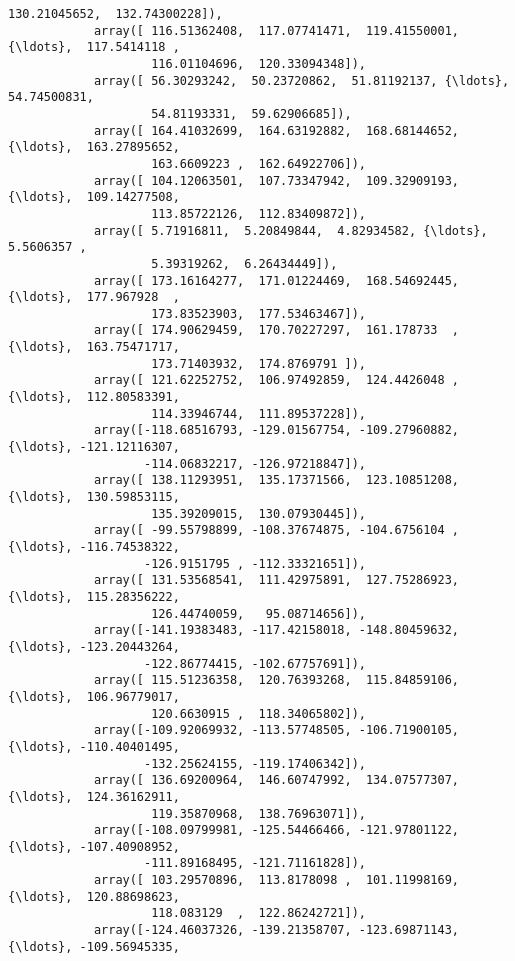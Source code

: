 \documentclass[11pt]{article}
\begin{document}
\begin{Verbatim}[commandchars=\\\{\}]
                    130.21045652,  132.74300228]),
            array([ 116.51362408,  117.07741471,  119.41550001, {\ldots},  117.5414118 ,
                    116.01104696,  120.33094348]),
            array([ 56.30293242,  50.23720862,  51.81192137, {\ldots},  54.74500831,
                    54.81193331,  59.62906685]),
            array([ 164.41032699,  164.63192882,  168.68144652, {\ldots},  163.27895652,
                    163.6609223 ,  162.64922706]),
            array([ 104.12063501,  107.73347942,  109.32909193, {\ldots},  109.14277508,
                    113.85722126,  112.83409872]),
            array([ 5.71916811,  5.20849844,  4.82934582, {\ldots},  5.5606357 ,
                    5.39319262,  6.26434449]),
            array([ 173.16164277,  171.01224469,  168.54692445, {\ldots},  177.967928  ,
                    173.83523903,  177.53463467]),
            array([ 174.90629459,  170.70227297,  161.178733  , {\ldots},  163.75471717,
                    173.71403932,  174.8769791 ]),
            array([ 121.62252752,  106.97492859,  124.4426048 , {\ldots},  112.80583391,
                    114.33946744,  111.89537228]),
            array([-118.68516793, -129.01567754, -109.27960882, {\ldots}, -121.12116307,
                   -114.06832217, -126.97218847]),
            array([ 138.11293951,  135.17371566,  123.10851208, {\ldots},  130.59853115,
                    135.39209015,  130.07930445]),
            array([ -99.55798899, -108.37674875, -104.6756104 , {\ldots}, -116.74538322,
                   -126.9151795 , -112.33321651]),
            array([ 131.53568541,  111.42975891,  127.75286923, {\ldots},  115.28356222,
                    126.44740059,   95.08714656]),
            array([-141.19383483, -117.42158018, -148.80459632, {\ldots}, -123.20443264,
                   -122.86774415, -102.67757691]),
            array([ 115.51236358,  120.76393268,  115.84859106, {\ldots},  106.96779017,
                    120.6630915 ,  118.34065802]),
            array([-109.92069932, -113.57748505, -106.71900105, {\ldots}, -110.40401495,
                   -132.25624155, -119.17406342]),
            array([ 136.69200964,  146.60747992,  134.07577307, {\ldots},  124.36162911,
                    119.35870968,  138.76963071]),
            array([-108.09799981, -125.54466466, -121.97801122, {\ldots}, -107.40908952,
                   -111.89168495, -121.71161828]),
            array([ 103.29570896,  113.8178098 ,  101.11998169, {\ldots},  120.88698623,
                    118.083129  ,  122.86242721]),
            array([-124.46037326, -139.21358707, -123.69871143, {\ldots}, -109.56945335,

\end{Verbatim}
\end{document}
